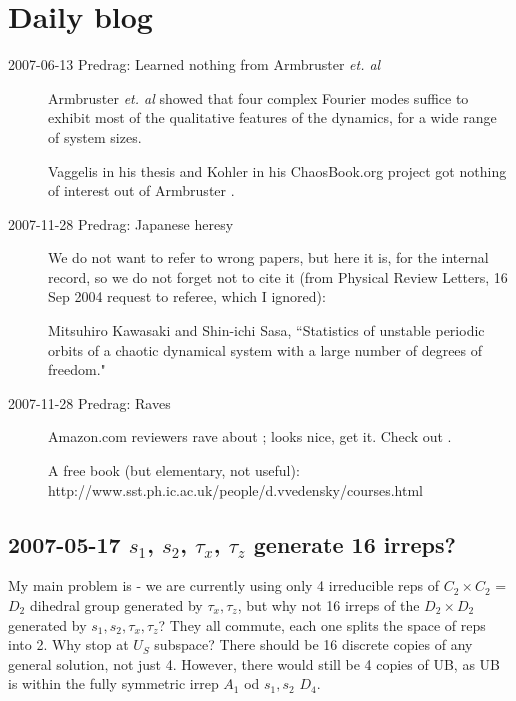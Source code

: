 
\chapter{Daily blog}
\label{c-DailyBlog}

\begin{description}

\item[2007-06-13 Predrag: Learned nothing from Armbruster {\em et. al}]
Armbruster {\em et. al} showed that four complex Fourier
modes suffice to exhibit most
of the qualitative features of the dynamics,
for a wide range of system sizes.

\medskip{} Vaggelis in his thesis and
     {Kohler in his ChaosBook.org project}
got nothing of interest out of Armbruster \etal{}.

\item[2007-11-28 Predrag: Japanese heresy]
We do not want to refer to wrong papers, but here it is, for
the internal record, so we do not forget not to cite it
(from Physical Review Letters, 16 Sep 2004 request to referee,
which I ignored):

Mitsuhiro Kawasaki and Shin-ichi Sasa,
    ``Statistics of unstable periodic orbits of a chaotic dynamical system
    with a large number of degrees of freedom."

\item[2007-11-28 Predrag: Raves]
Amazon.com reviewers rave about ;
looks nice, get it.
Check out
 .

A free book (but elementary, not useful):
http://www.sst.ph.ic.ac.uk/people/d.vvedensky/courses.html

\end{description}


\section{2007-05-17 $s_1$, $s_2$, $\tau_x$, $\tau_z$ generate 16 irreps?}

\medskip{}
 My main problem is - we are currently using only 4 irreducible reps
of $C_2 \times C_2$ = $D_2$ dihedral group generated by $\tau_x, \tau_z$,
but why not 16 irreps of
the $D_2 \times D_2$ generated by $s_1, s_2, \tau_x, \tau_z$?
They all commute, each one splits the space of reps into 2.
Why stop at $U_S$ subspace?
There should be 16 discrete copies of any
general solution, not just 4.
However, there would still be 4 copies of UB, as UB is within the
fully symmetric irrep $A_1$ od $s_1, s_2$ $D_4$.

